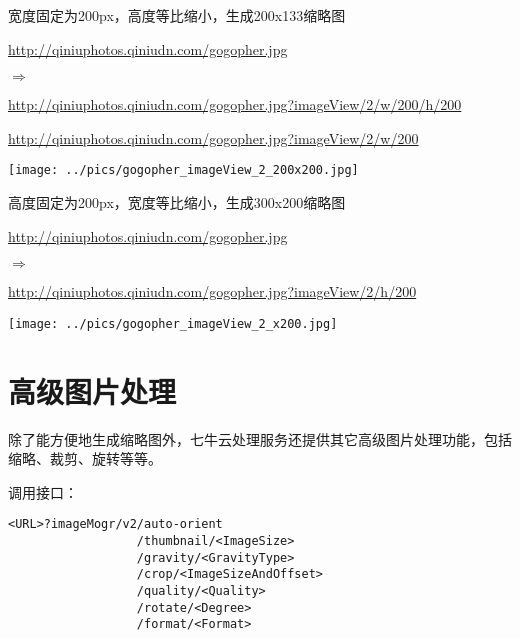 \documentclass[11pt, oneside]{book}
\newcommand{\qpar}[1]{
\vspace{0.25em}
\noindent
#1\par
\vspace{0.25em}
}
\newcommand{\qurl}[1]{\url{#1}}
\begin{document}
\begin{CJK*}{UTF8}{song}
\begin{sample}
  \label{imageView-1-200x200}
\end{sample}

\begin{sample}
  \caption{宽度固定为200px，高度等比缩小，生成200x133缩略图}
    \qpar{\qurl{http://qiniuphotos.qiniudn.com/gogopher.jpg}}
    \qpar{$\Rightarrow$}
    \qpar{\qurl{http://qiniuphotos.qiniudn.com/gogopher.jpg?imageView/2/w/200/h/200}}
    \qpar{\qurl{http://qiniuphotos.qiniudn.com/gogopher.jpg?imageView/2/w/200}}

    \begin{center}
    \texttt{[image: ../pics/gogopher\_imageView\_2\_200x200.jpg]}
    \end{center}
  \label{imageView-2-200x200}
\end{sample}

\begin{sample}
  \caption{高度固定为200px，宽度等比缩小，生成300x200缩略图}
    \qpar{\qurl{http://qiniuphotos.qiniudn.com/gogopher.jpg}}
    \qpar{$\Rightarrow$}
    \qpar{\qurl{http://qiniuphotos.qiniudn.com/gogopher.jpg?imageView/2/h/200}}

    \begin{center}
    \texttt{[image: ../pics/gogopher\_imageView\_2\_x200.jpg]}
    \end{center}
  \label{imageView-2-x200}
\end{sample}

\clearpage

\section{高级图片处理}

\qpar{除了能方便地生成缩略图外，七牛云处理服务还提供其它高级图片处理功能，包括缩略、裁剪、旋转等等。}
\qpar{调用接口：}
\begin{lstlisting}[basicstyle=\ttfamily\footnotesize]
<URL>?imageMogr/v2/auto-orient
                  /thumbnail/<ImageSize>
                  /gravity/<GravityType>
                  /crop/<ImageSizeAndOffset>
                  /quality/<Quality>
                  /rotate/<Degree>
                  /format/<Format>
\end{lstlisting}


\end{CJK*}
\end{document}
